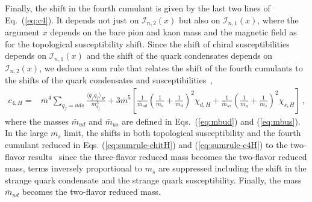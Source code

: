 \documentclass[12pt]{elsarticle}
\begin{document}
Finally, the shift in the fourth cumulant is given by the last two lines of Eq.~(\ref{eq:c4}). It depends not just on $\mathcal{I}_{n,2}(x)$ but also on $\mathcal{I}_{n,1}(x)$, where the argument $x$ depends on the bare pion and kaon mass and the magnetic field as for the topological susceptibility shift. Since the shift of chiral susceptibilities depends on $\mathcal{I}_{n,1}(x)$ and the shift of the quark condensates depends on $\mathcal{I}_{n,2}(x)$, we deduce a sum rule that relates the shift of the fourth cumulants to the shifts of the quark condensates and susceptibilities~\cite{Adhikari:2021lbl},
\begin{align}
\label{eq:sumrule-c4H}
c_{4,H}=&\bar{m}^{4}\sum_{q_{f}=uds}\frac{\langle\bar{q}_{f}q_{f}\rangle_{H}}{m_{q_{f}}^{3}}+3\bar{m}^{5}\left[\frac{1}{\bar{m}_{ud}}\left(\frac{1}{m_{u}}+\frac{1}{m_{d}}\right)^{2}\chi_{d,H}+\frac{1}{\bar{m}_{us}}\left(\frac{1}{m_{u}}+\frac{1}{m_{s}}\right)^{2}\chi_{s,H}\right]\ ,
\end{align}
where the masses $\bar{m}_{ud}$ and $\bar{m}_{us}$ are defined in Eqs.~(\ref{eq:mbud}) and (\ref{eq:mbus}). 
In the large $m_{s}$ limit, the shifts in both topological susceptibility and the fourth cumulant reduced in Eqs. (\ref{eq:sumrule-chitH}) and (\ref{eq:sumrule-c4H}) to the two-flavor results~\cite{Adhikari:2021xra} since the three-flavor reduced mass becomes the two-flavor reduced mass, terms inversely proportional to $m_{s}$ are suppressed including the shift in the strange quark condensate and the strange quark susceptibility. Finally, the mass $\bar{m}_{ud}$ becomes the two-flavor reduced mass.
\end{document}
